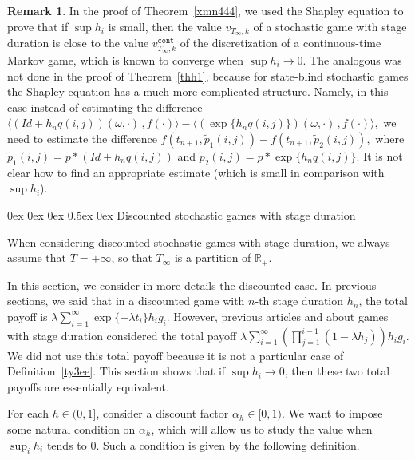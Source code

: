 \documentclass[english,openary,12pt]{article}
\makeatletter
\renewcommand\section{\@startsection {section}{1}{\z@}%
                                   {0ex \@plus 0ex \@minus 0ex}%
                                   {0.5ex \@plus0ex}%
                                   {\normalfont\LARGE\bfseries}}%
\theoremstyle{definition}
\newtheorem{remark}{Remark}
\newcommand{\R}{\mathbb{R}}
\makeatother
\begin{document}
\begin{remark}
In the proof of Theorem~\ref{xmn444}, we used the Shapley equation to prove that if $\sup h_i$ is small, then the value $v_{T_\infty,k}$ of a stochastic game with stage duration is close to the value $v^{\texttt{cont}}_{T_\infty,k}$ of the discretization of a continuous-time Markov game, which is known to converge when $\sup h_i \to 0$. The analogous was not done in the proof of Theorem~\ref{thh1}, because for state-blind stochastic games the Shapley equation has a much more complicated structure. Namely, in this case instead of estimating the difference
$\langle(Id + h_n q(i,j))(\omega,\cdot)\,, f(\cdot)\rangle - 
\langle(\exp{\{h_n q(i,j)\}})(\omega,\cdot)\,, f(\cdot)\rangle,$
we need to estimate the difference
$f(t_{n+1},
\widetilde p_1(i,j)) - f(t_{n+1},
\widetilde p_2(i,j)),$
where 
$\widetilde p_1(i,j) = p*(Id + h_n q(i,j))$ and
$\widetilde p_2(i,j) = p* \exp{\{h_n q(i,j)\}}$.
It is not clear how to find an appropriate estimate (which is small in comparison with $\sup h_i$).
\end{remark}

\section{Discounted stochastic games with stage duration}
\label{disc}

When considering discounted stochastic games with stage duration, we always assume that $T=+\infty$, so that $T_\infty$ is a partition of $\R_+$.

In this section, we consider in more details the discounted case. In previous sections, we said that in a discounted game with $n$-th stage duration $h_n$, the total payoff is 
$\lambda \sum\nolimits_{i = 1}^\infty \exp\{-\lambda t_i\} h_i g_i$. However, previous articles \cite{Ney13} and \cite{SorVig16} about games with stage duration considered the total payoff 
$\lambda \sum\limits_{i = 1}^\infty (\prod\limits_{j = 1}^{i-1} (1-\lambda h_j) ) h_i g_i$.
We did not use this total payoff because it is not a particular case of Definition~\ref{ty3ee}. This section shows that if $\sup h_i \to 0$, then these two total payoffs are essentially equivalent.

For each $h\in(0,1]$, consider a discount factor $\alpha_h \in [0, 1)$.
We want to impose some natural condition on $\alpha_h$, which will allow us to
study the value when $\sup_{i} h_i$ tends to $0$. 
Such a condition is given by the following definition.
\end{document}
